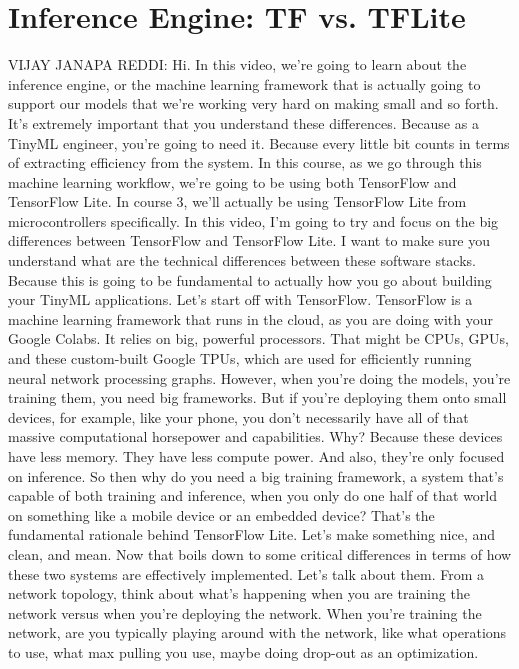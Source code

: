 \section{Inference Engine: TF vs. TFLite}

VIJAY JANAPA REDDI: Hi.
In this video, we're going to learn about the inference engine,
or the machine learning framework that is actually
going to support our models that we're working very hard on making small
and so forth.
It's extremely important that you understand these differences.
Because as a TinyML engineer, you're going to need it.
Because every little bit counts in terms of extracting efficiency
from the system.
In this course, as we go through this machine learning workflow,
we're going to be using both TensorFlow and TensorFlow Lite.
In course 3, we'll actually be using TensorFlow Lite from microcontrollers
specifically.
In this video, I'm going to try and focus
on the big differences between TensorFlow and TensorFlow Lite.
I want to make sure you understand what are the technical differences
between these software stacks.
Because this is going to be fundamental to actually
how you go about building your TinyML applications.
Let's start off with TensorFlow.
TensorFlow is a machine learning framework that runs in the cloud,
as you are doing with your Google Colabs.
It relies on big, powerful processors.
That might be CPUs, GPUs, and these custom-built Google
TPUs, which are used for efficiently running neural network processing
graphs.
However, when you're doing the models, you're training them,
you need big frameworks.
But if you're deploying them onto small devices, for example, like your phone,
you don't necessarily have all of that massive computational horsepower
and capabilities.
Why?
Because these devices have less memory.
They have less compute power.
And also, they're only focused on inference.
So then why do you need a big training framework,
a system that's capable of both training and inference, when you only
do one half of that world on something like a mobile device
or an embedded device?
That's the fundamental rationale behind TensorFlow Lite.
Let's make something nice, and clean, and mean.
Now that boils down to some critical differences
in terms of how these two systems are effectively implemented.
Let's talk about them.
From a network topology, think about what's
happening when you are training the network versus when
you're deploying the network.
When you're training the network, are you typically
playing around with the network, like what operations to use,
what max pulling you use, maybe doing drop-out as an optimization.
